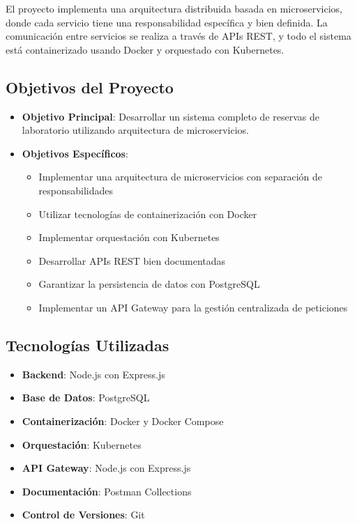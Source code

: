 \documentclass[12pt,a4paper]{article}
\begin{document}
El proyecto implementa una arquitectura distribuida basada en microservicios, donde cada servicio tiene una responsabilidad específica y bien definida. La comunicación entre servicios se realiza a través de APIs REST, y todo el sistema está containerizado usando Docker y orquestado con Kubernetes.

\subsection{Objetivos del Proyecto}

\begin{itemize}
    \item \textbf{Objetivo Principal}: Desarrollar un sistema completo de reservas de laboratorio utilizando arquitectura de microservicios.
    \item \textbf{Objetivos Específicos}:
    \begin{itemize}
        \item Implementar una arquitectura de microservicios con separación de responsabilidades
        \item Utilizar tecnologías de containerización con Docker
        \item Implementar orquestación con Kubernetes
        \item Desarrollar APIs REST bien documentadas
        \item Garantizar la persistencia de datos con PostgreSQL
        \item Implementar un API Gateway para la gestión centralizada de peticiones
    \end{itemize}
\end{itemize}

\subsection{Tecnologías Utilizadas}

\begin{itemize}
    \item \textbf{Backend}: Node.js con Express.js
    \item \textbf{Base de Datos}: PostgreSQL
    \item \textbf{Containerización}: Docker y Docker Compose
    \item \textbf{Orquestación}: Kubernetes
    \item \textbf{API Gateway}: Node.js con Express.js
    \item \textbf{Documentación}: Postman Collections
    \item \textbf{Control de Versiones}: Git
\end{itemize}
\end{document}
